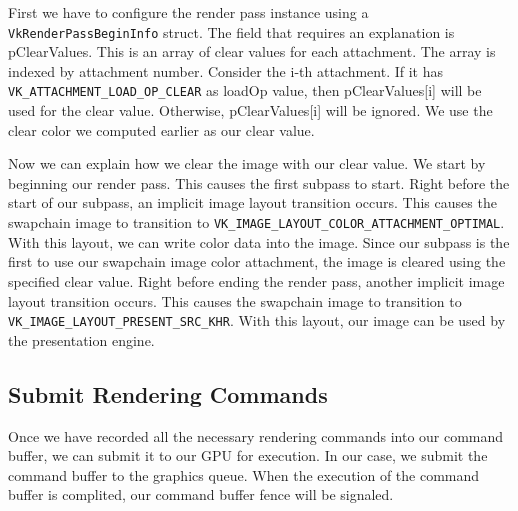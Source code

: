 First we have to configure the render pass instance using a \texttt{VkRenderPassBeginInfo}
struct.
The field that requires an explanation is pClearValues.
This is an array of clear values for each attachment.
The array is indexed by attachment number.
Consider the i-th attachment.
If it has \texttt{VK\_ATTACHMENT\_LOAD\_OP\_CLEAR}
as loadOp value, then pClearValues[i] will be used for the clear value.
Otherwise, pClearValues[i] will be ignored.
We use the clear color we computed earlier as our clear value.

\begin{minipage}{\linewidth}{\noindent}
    
\end{minipage}

Now we can explain how we clear the image with our clear value.
We start by beginning our render pass.
This causes the first subpass to start.
Right before the start of our subpass, an implicit image layout transition occurs.
This causes the swapchain image to transition to
\texttt{VK\_IMAGE\_LAYOUT\_COLOR\_ATTACHMENT\_OPTIMAL}.
With this layout, we can write color data into the image.
Since our subpass is the first to use our swapchain image color attachment, the image
is cleared using the specified clear value.
Right before ending the render pass, another implicit image layout transition occurs.
This causes the swapchain image to transition to
\texttt{VK\_IMAGE\_LAYOUT\_PRESENT\_SRC\_KHR}.
With this layout, our image can be used by the presentation engine.

\subsection{Submit Rendering Commands}

Once we have recorded all the necessary rendering commands into our command
buffer, we can submit it to our GPU for execution.
In our case, we submit the command buffer to the graphics queue.
When the execution of the command buffer is complited, our command buffer fence
will be signaled.

\begin{minipage}{\linewidth}{\noindent}
    
\end{minipage}

